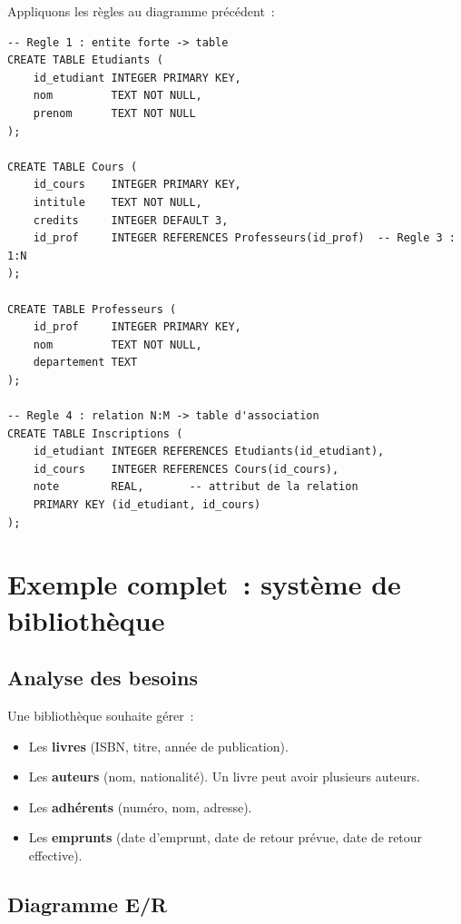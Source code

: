\begin{exemple}
Appliquons les r\`egles au diagramme pr\'ec\'edent~:

\begin{codeblock}[title=\textbf{Traduction du diagramme E/R en SQL}]
\begin{verbatim}
-- Regle 1 : entite forte -> table
CREATE TABLE Etudiants (
    id_etudiant INTEGER PRIMARY KEY,
    nom         TEXT NOT NULL,
    prenom      TEXT NOT NULL
);

CREATE TABLE Cours (
    id_cours    INTEGER PRIMARY KEY,
    intitule    TEXT NOT NULL,
    credits     INTEGER DEFAULT 3,
    id_prof     INTEGER REFERENCES Professeurs(id_prof)  -- Regle 3 : 1:N
);

CREATE TABLE Professeurs (
    id_prof     INTEGER PRIMARY KEY,
    nom         TEXT NOT NULL,
    departement TEXT
);

-- Regle 4 : relation N:M -> table d'association
CREATE TABLE Inscriptions (
    id_etudiant INTEGER REFERENCES Etudiants(id_etudiant),
    id_cours    INTEGER REFERENCES Cours(id_cours),
    note        REAL,       -- attribut de la relation
    PRIMARY KEY (id_etudiant, id_cours)
);
\end{verbatim}
\end{codeblock}
\end{exemple}

\section{Exemple complet~: syst\`eme de biblioth\`eque}

\subsection{Analyse des besoins}
Une biblioth\`eque souhaite g\'erer~:
\begin{itemize}
    \item Les \textbf{livres} (ISBN, titre, ann\'ee de publication).
    \item Les \textbf{auteurs} (nom, nationalit\'e). Un livre peut avoir plusieurs auteurs.
    \item Les \textbf{adh\'erents} (num\'ero, nom, adresse).
    \item Les \textbf{emprunts} (date d'emprunt, date de retour pr\'evue, date de retour effective).
\end{itemize}

\subsection{Diagramme E/R}

